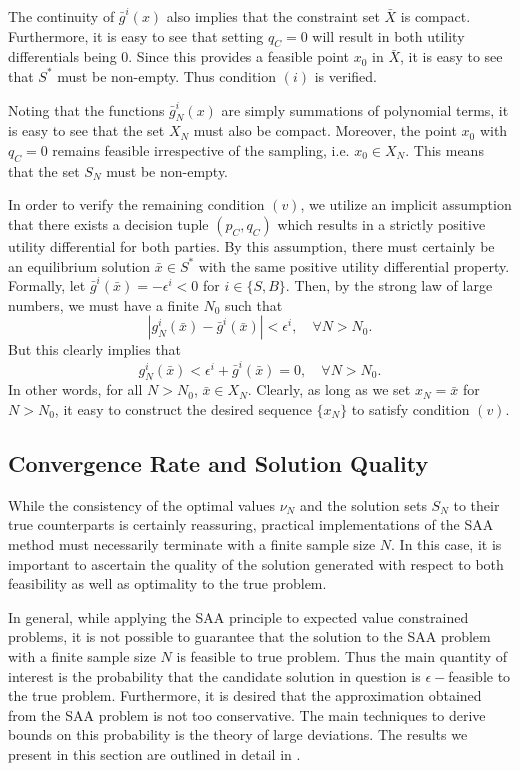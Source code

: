 The continuity of $\bar{g}^i(x)$ also implies that the constraint set $\bar{X}$
is compact. Furthermore, it is easy to see that setting $q_C = 0$ will result in
both utility differentials being 0. Since this provides a feasible point $x_0$ in
$\bar{X}$, it is easy to see that $S^*$ must be non-empty. Thus condition $(i)$
is verified.

Noting that the functions $\bar{g}^i_N(x)$ are simply summations of polynomial
terms, it is easy to see that the set $X_N$ must also be compact. Moreover, the
point $x_0$ with $q_C = 0$ remains feasible irrespective of the sampling, i.e.
$x_0 \in X_N$. This means that the set $S_N$ must be non-empty. 

In order to verify the remaining condition $(v)$, we utilize an implicit
assumption that there exists a decision tuple $(p_C, q_C)$ which results in a
strictly positive utility differential for both parties. By this assumption,
there must certainly be an equilibrium solution $\bar{x} \in S^*$ with the same
positive utility differential property. Formally, let
$\bar{g}^i(\bar{x}) = - \epsilon^i < 0$ for $i \in \{S,B\}$. Then, by the strong law
of large numbers, we must have a finite $N_0$ such that 
\[ | g^i_N(\bar{x}) - \bar{g}^i(\bar{x}) | < \epsilon^i, \quad \forall N > N_0. \]
But this clearly implies that 
\[ g^i_N(\bar{x}) < \epsilon^i + \bar{g}^i(\bar{x}) = 0, \quad \forall N > N_0. \]
In other words, for all $N > N_0$, $\bar{x} \in X_N$. Clearly, as long as we set
$x_N = \bar{x}$ for $N > N_0$, it easy to construct the desired sequence
$\{x_N\}$ to satisfy condition $(v)$.

\subsection{Convergence Rate and Solution Quality}

While the consistency of the optimal values $\nu_N$ and the solution sets $S_N$
to their true counterparts is certainly reassuring, practical
implementations of the SAA method must necessarily terminate with a finite
sample size $N$. In this case, it is important to ascertain the quality of the
solution generated with respect to both feasibility as well as optimality to the
true problem. 

In general, while applying the SAA principle to expected value constrained
problems, it is not possible to guarantee that the solution to the SAA problem
with a finite sample size $N$ is feasible to true problem. Thus the main
quantity of interest is the probability that the candidate solution in question
is $\epsilon-$feasible to the true problem. Furthermore, it is desired that the
approximation obtained from the SAA problem is not too conservative. The main
techniques to derive bounds on this probability is the theory of large
deviations. The results we present in this section are outlined
in detail in \cite{wang_sample_2008}.

